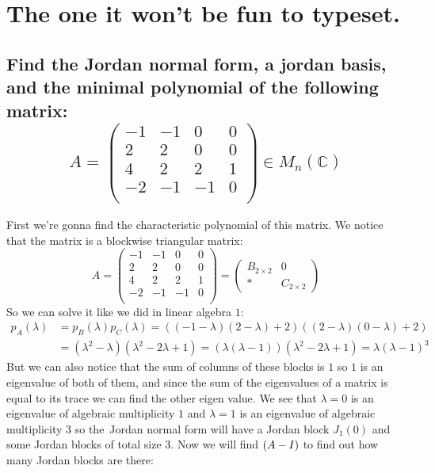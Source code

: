 \documentclass[11pt,a4paper]{article}
\theoremstyle{plain}
\newcommand{\C}{\mathbb{C}}
\begin{document}
	\newpage
	
	\section{The one it won't be fun to typeset.}
	\subsection{Find the Jordan normal form, a jordan basis, and the minimal
	polynomial of the following matrix:
	\[ A = 
\begin{pmatrix}
	-1 & -1 & 0 & 0 \\
	2 & 2 & 0 & 0 \\
	4 & 2 & 2 & 1 \\
	-2 & -1 & -1 & 0 \\
\end{pmatrix}\in M_n(\C)
	\]}
	First we're gonna find the characteristic polynomial of this matrix. We
	notice that the matrix is a blockwise triangular matrix:
	\[ A = 
\begin{pmatrix}
	-1 & -1 & 0 & 0\\
	2 & 2 & 0 & 0\\
	4 & 2 & 2 & 1\\
	-2 & -1 & -1 & 0\\
\end{pmatrix}
		=
\begin{pmatrix}
	B_{2\times 2} & 0\\
	* & C_{2\times 2}
\end{pmatrix}
	\]
	So we can solve it like we did in linear algebra $1$:
	\begin{align*}
		p_A(\lambda) &= p_B(\lambda)p_C(\lambda) = 
		((-1-\lambda)(2-\lambda)+2)((2-\lambda)(0-\lambda)+2) \\
		&= (\lambda^2-\lambda)(\lambda^2-2\lambda+1) = 
		   (\lambda(\lambda-1))(\lambda^2-2\lambda+1) = 
		   \lambda(\lambda-1)^3
	\end{align*}
	But we can also notice that the sum of columns of these blocks is $1$ so
	$1$ is an eigenvalue of both of them, and since the sum of the eigenvalues
	of a matrix is equal to its trace we can find the other eigen value.
	We see that $\lambda = 0$ is an eigenvalue of algebraic multiplicity $1$
	and $\lambda = 1$ is an eigenvalue of algebraic multiplicity $3$ so the\
	Jordan normal form will have a Jordan block $J_1(0)$ and some Jordan blocks
	of total size $3$. Now we will find $\null(A-I)$ to find out how many Jordan
	blocks are there:
\end{document}
